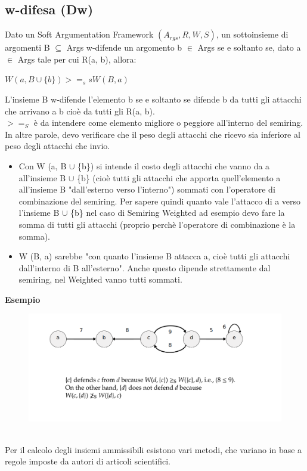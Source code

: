 \subsection{w-difesa (Dw)}
Dato un Soft Argumentation Framework $(A_{rgs} , R, W, S)$, un sottoinsieme di argomenti B $\subseteq$ Args w-difende un argomento b $\in$ Args se e soltanto se, dato a $\in$ Args tale per cui R(a, b), allora:
\begin{center}
    $W (a, B \cup \{b\}) >=_s s W (B, a)$
\end{center}
L’insieme B w-difende l’elemento b se e soltanto se difende b da tutti gli attacchi che arrivano a b cioè da tutti gli R(a, b).
\\$>=_S$ è da intendere come elemento migliore o peggiore all’interno del semiring.
\\In altre parole, devo verificare che il peso degli attacchi che ricevo sia inferiore al peso degli attacchi che invio.
\begin{itemize}
    \item Con W (a, B $\cup$ \{b\}) si intende il costo degli attacchi che vanno da a all’insieme B $\cup$ \{b\} (cioè tutti gli attacchi che apporta quell’elemento a all’insieme B "dall’esterno verso l’interno") sommati con l’operatore di combinazione del semiring. Per sapere quindi quanto vale l’attacco di a verso l’insieme B $\cup$ \{b\} nel caso di Semiring Weighted ad esempio devo fare la somma di tutti gli attacchi (proprio perchè l’operatore di combinazione è la somma).
    \item W (B, a) sarebbe "con quanto l’insieme B attacca a, cioè tutti gli attacchi dall’interno di B all’esterno". Anche questo dipende strettamente dal semiring, nel Weighted vanno tutti sommati.
\end{itemize}
\textbf{Esempio}
\begin{figure}[htp]
	\centering
    \includegraphics[width=14cm, keepaspectratio]{latex/img/Cap6/srs2.png}
\end{figure}
\\Per il calcolo degli insiemi ammissibili esistono vari metodi, che variano in base a regole imposte da autori di articoli scientifici.

